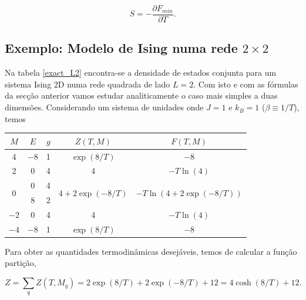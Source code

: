 \documentclass[12pt, a4paper]{article}
\begin{document}
\begin{equation}\label{S_dev}
	S = - \frac{\partial F_{min}}{\partial T}.
\end{equation}

	\subsection{Exemplo: Modelo de Ising numa rede $2 \times 2$}
	
	Na tabela \ref{exact_L2} encontra-se a densidade de estados conjunta para um sistema Ising 2D numa rede quadrada de lado $L=2$. Com isto e com as fórmulas da secção anterior vamos estudar analiticamente o caso mais simples a duas dimensões.  Considerando um sistema de unidades onde $J=1$ e $k_B = 1$ ($\beta \equiv 1/T$), temos

\begin{table}[h]
\centering
	\begin{tabular}{c|c|c|c|c}
	$M$                  & $E$  & $g$ & $Z(T, M)$                          & $F(T, M)$                                   \\ \hline
	4                  & $-8$ & 1       & $\exp(8/T)$                     & $-8$                                        \\ \hline
	2                  & 0  & 4       & 4                                & $-T\ln(4)$                               \\ \hline
	\multirow{2}{*}{0} & 0  & 4       & \multirow{2}{*}{$4+2\exp(-8/T)$} & \multirow{2}{*}{$-T\ln(4+2\exp(-8/T))$} \\  \cline{2-3}
	                   & 8  & 2       &                                  &                                           \\ \hline
	$-2$                 & 0  & 4       & 4                                & $-T\ln(4)$                               \\ \hline
	$-4$                 & $-8$ & 1       & $\exp(8/T)$                     & $-8$                                       
	\end{tabular}
\end{table}

	Para obter as quantidades termodinâmicas desejáveis, temos de calcular a função partição,
	
	\begin{equation}
		Z = \sum_q Z(T, M_q) = 2\exp(8/T) + 2\exp(-8/T) + 12 = 4 \cosh(8 / T) + 12.
	\end{equation}
	
\end{document}
